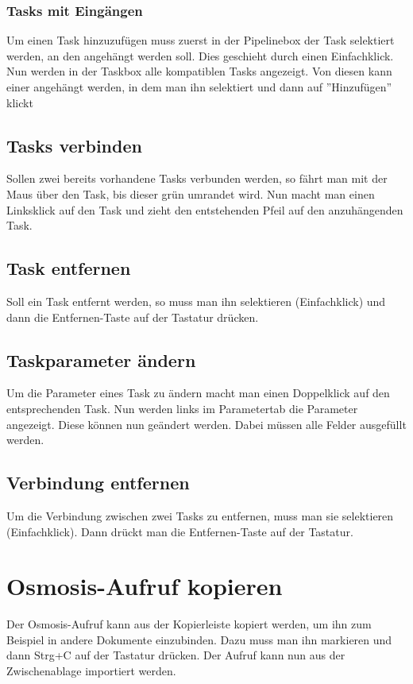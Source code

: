 \documentclass[a4paper,10pt]{scrartcl}
\begin{document}
\subsubsection{Tasks mit Eingängen}
Um einen Task hinzuzufügen muss zuerst in der Pipelinebox der Task selektiert werden, an den angehängt werden soll. Dies geschieht durch einen Einfachklick. Nun werden in der Taskbox alle kompatiblen Tasks angezeigt. Von diesen kann einer angehängt werden, in dem man ihn selektiert und dann auf ''Hinzufügen'' klickt
\subsection{Tasks verbinden}
Sollen zwei bereits vorhandene Tasks verbunden werden, so fährt man mit der Maus über den Task, bis dieser grün umrandet wird. Nun macht man einen Linksklick auf den Task und zieht den entstehenden Pfeil auf den anzuhängenden Task.
\subsection{Task entfernen}
Soll ein Task entfernt werden, so muss man ihn selektieren (Einfachklick) und dann die Entfernen-Taste auf der Tastatur drücken. 
\subsection{Taskparameter ändern}
Um die Parameter eines Task zu ändern macht man einen Doppelklick auf den entsprechenden Task. Nun werden links im Parametertab die Parameter angezeigt. Diese können nun geändert werden. Dabei müssen alle Felder ausgefüllt werden. 
\subsection{Verbindung entfernen}
Um die Verbindung zwischen zwei Tasks zu entfernen, muss man sie selektieren (Einfachklick). Dann drückt man die Entfernen-Taste auf der Tastatur. 

\section{Osmosis-Aufruf kopieren}
Der Osmosis-Aufruf kann aus der Kopierleiste kopiert werden, um ihn zum Beispiel in andere Dokumente einzubinden. Dazu muss man ihn markieren und dann Strg+C auf der Tastatur drücken. Der Aufruf kann nun aus der Zwischenablage importiert werden.
\end{document}
